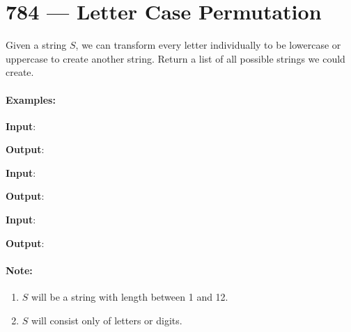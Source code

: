 \section{784 --- Letter Case Permutation}
Given a string $S$, we can transform every letter individually to be lowercase or uppercase to create another string.  Return a list of all possible strings we could create.

\paragraph{Examples:}
\begin{flushleft}


\textbf{Input}: 

\textbf{Output}: \fcj{["a1b2", "a1B2", "A1b2", "A1B2"]}

\textbf{Input}: 

\textbf{Output}: \fcj{["3z4", "3Z4"]}

\textbf{Input}: 

\textbf{Output}: \fcj{["12345"]}

\end{flushleft}

\paragraph{Note:}

\begin{enumerate}
\item $S$ will be a string with length between 1 and 12.
\item $S$ will consist only of letters or digits.
\end{enumerate}